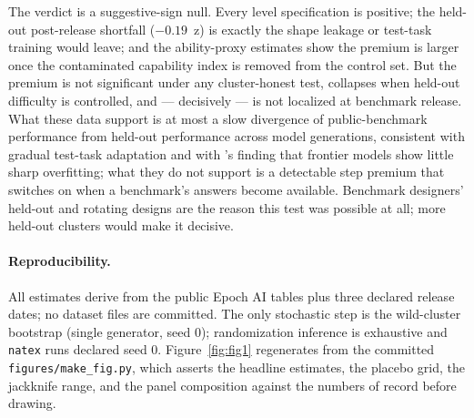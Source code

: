 \documentclass[11pt]{article}
\newcommand{\natex}{\texttt{natex}}
\begin{document}
The verdict is a suggestive-sign null. Every level specification is
positive; the held-out post-release shortfall ($-0.19$~z) is exactly the
shape leakage or test-task training \cite{dominguez2024} would leave; and
the ability-proxy estimates show the premium is larger once the
contaminated capability index is removed from the control set. But the
premium is not significant under any cluster-honest test, collapses when
held-out difficulty is controlled, and --- decisively --- is not localized
at benchmark release. What these data support is at most a slow divergence
of public-benchmark performance from held-out performance across model
generations, consistent with gradual test-task adaptation
\cite{dominguez2024} and with \cite{zhang2024}'s finding that frontier
models show little sharp overfitting; what they do not support is a
detectable step premium that switches on when a benchmark's answers become
available. Benchmark designers' held-out and rotating designs
\cite{glazer2024,phan2025,chollet2025,white2024} are the reason this test
was possible at all; more held-out clusters would make it decisive.

\paragraph{Reproducibility.} All estimates derive from the public Epoch AI
tables plus three declared release dates; no dataset files are committed.
The only stochastic step is the wild-cluster bootstrap (single generator,
seed 0); randomization inference is exhaustive and \natex{} runs declared
seed 0. Figure~\ref{fig:fig1} regenerates from the committed
\texttt{figures/make\_fig.py}, which asserts the headline estimates, the
placebo grid, the jackknife range, and the panel composition against the
numbers of record before drawing.
\end{document}
